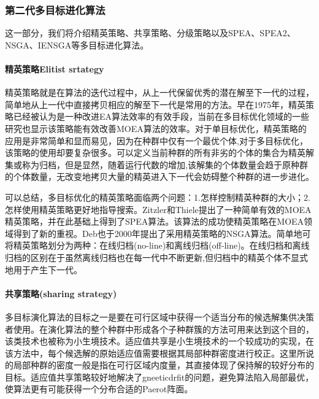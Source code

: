         \subsubsection{第二代多目标进化算法}
            \par
            这一部分，我们将介绍精英策略、共享策略、分级策略以及SPEA、SPEA2、NSGA、IENSGA等多目标进化算法。
            \paragraph{精英策略Elitist srtategy}精英策略就是在算法的迭代过程中，从上一代保留优秀的潜在解至下一代的过程，简单地从上一代中直接拷贝相应的解至下一代是常用的方法。早在1975年，精英策略已经被认为是一种改进EA算法效率的有效手段，当前在多目标优化领域的一些研究也显示该策略能有效改善MOEA算法的效率。对于单目标优化，精英策略的应用是非常简单和显而易见，因为在种群中仅有一个最优个体,对于多目标优化，该策略的使用却要复杂很多。可以定义当前种群的所有非劣的个体的集合为精英解集或称为归档，但是显然，随着运行代数的增加,该解集的个体数量会趋于原种群的个体数量，无改变地拷贝大量的精英进入下一代会妨碍整个种群的进一步进化。
            \par
            可以总结，多目标优化的精英策略面临两个问题：1.怎样控制精英种群的大小；2.怎样使用精英策略更好地指导搜索。Zitzler和Thiele提出了一种简单有效的MOEA精英策略，并在此基础上得到了SPEA算法。该算法的成功使精英策略在MOEA领域得到了新的重视。Deb也于2000年提出了采用精英策略的NSGA算法。简单地可将精英策略划分为两种：在线归档(no-line)和离线归档(off-line)。在线归档和离线归档的区别在于虽然离线归档也在每一代中不断更新,但归档中的精英个体不显式地用于产生下一代。
            \paragraph{共享策略(sharing strategy)}多目标演化算法的目标之一是要在可行区域中获得一个适当分布的候选解集供决策者使用。在演化算法的整个种群中形成各个子种群簇的方法可用来达到这个目的，该类技术也被称为小生境技术。适应值共享是小生境技术的一个较成功的实现，在该方法中，每个候选解的原始适应值需要根据其局部种群密度进行校正。这里所说的局部种群的密度一般是指在可行区域内度量，其直接体现了保持解的较好分布的目标。适应值共享策略较好地解决了gneeticdrfit的问题，避免算法陷入局部最优，使算法更有可能获得一个分布合适的Paerot阵面。
